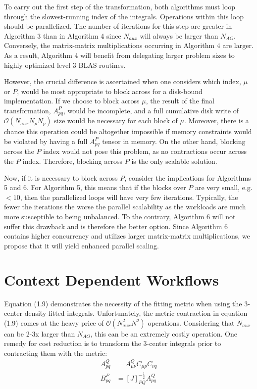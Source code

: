 To carry out the first step of the transformation, both algorithms must loop through the slowest-running index of the integrals.
Operations within this loop should be parallelized.
The number of iterations for this step are greater in Algorithm 3 than in Algorithm 4 since $N_{aux}$ will always be 
larger than $N_{AO}$.
Conversely, the matrix-matrix multiplications occurring in Algorithm 4 are larger. As a result, Algorithm 4 will benefit from delegating
larger problem sizes to highly optimized level 3 BLAS routines. 

However, the crucial difference is ascertained when one considers which index, $\mu$ or $P$, would be most appropriate to block across
for a disk-bound implementation. If we choose to block across $\mu$, the result of the final transformation, $A_{pq}^P$, would be incomplete,
and a full cumulative disk write of $\mathcal{O}(N_{aux}N_pN_p)$ size would be necessary for each block of $\mu$. Moreover, there is a chance
this operation could be altogether impossible if memory constraints would be violated by having a full $A_{pq}^P$ tensor in memory. 
On the other hand, 
blocking across the $P$ index would not pose this problem, as no contractions occur across the $P$ index. Therefore, blocking across 
$P$ is the only scalable solution.

Now, if it is necessary to block across $P$, consider the implications for Algorithms 5 and 6. For Algorithm 5, this means that if the blocks
over $P$ are very small, e.g. $<10$, then the parallelized loops will have very few iterations. Typically, the fewer the iterations the worse
the parallel scalability as the workloads are much more susceptible to being unbalanced. To the contrary, Algorithm 6 will not suffer this 
drawback and is therefore the better option. Since Algorithm 6 contains higher concurrency and utilizes larger matrix-matrix multiplications, 
we propose that it will yield enhanced parallel scaling. 

\section{Context Dependent Workflows}

Equation (1.9) demonstrates the necessity of the fitting metric when using the 3-center density-fitted integrals. Unfortunately, the
metric contraction in equation (1.9) comes at the heavy price of $\mathcal{O}(N_{aux}^2N^2)$ operations.
Considering that $N_{aux}$ can be 2-3x larger
than $N_{AO}$, this can be an extremely costly operation. One remedy for cost reduction is to transform the 3-center integrals prior to contracting
them with the metric:
\begin{align} 
A_{p q}^Q &= A_{\mu \nu}^Q C_{\mu p}C_{\nu q} \\
B_{pq}^P &= [J]_{PQ}^{-\frac{1}{2}}A_{p q}^Q
\end{align}
 
